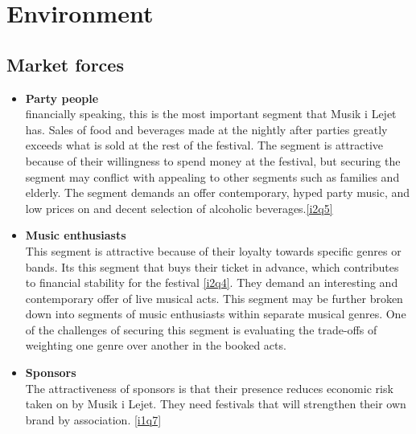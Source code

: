 \section{Environment} %
\subsection{Market forces}

\begin{itemize}
	\item \textbf{Party people}\\
	financially speaking, this is the most important segment that Musik i Lejet has. Sales of food and beverages made at the nightly after parties greatly exceeds what is sold at the rest of the festival. The segment is attractive because of their willingness to spend money at the festival, but securing the segment may conflict with appealing to other segments such as families and elderly. The segment demands an offer contemporary, hyped party music, and low prices on and decent selection of alcoholic beverages.\ref{i2q5}
	\item \textbf{Music enthusiasts}\\
	This segment is attractive because of their loyalty towards specific genres or bands. Its this segment that buys their ticket in advance, which contributes to financial stability for the festival \ref{i2q4}. They demand an interesting and contemporary offer of live musical acts. This segment may be further broken down into segments of music enthusiasts within separate musical genres. One of the challenges of securing this segment is evaluating the trade-offs of weighting one genre over another in the booked acts.
	\item \textbf{Sponsors}\\
	The attractiveness of sponsors is that their presence reduces economic risk taken on by Musik i Lejet. They need festivals that will strengthen their own brand by association. \ref{i1q7}
\end{itemize}

